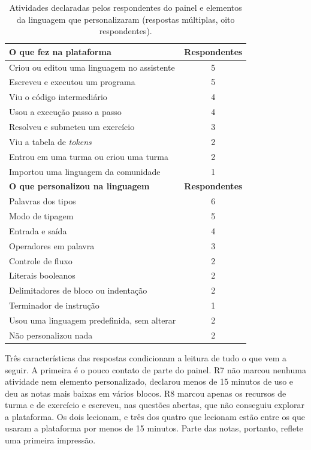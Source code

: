 \begin{table}[htbp]
\centering
\caption{Atividades declaradas pelos respondentes do painel e elementos da linguagem que personalizaram (respostas múltiplas, oito respondentes).}
\label{tab:resultado-atividades}
\footnotesize
\renewcommand{\arraystretch}{1.2}
\begin{tabular}{|p{10.5cm}|c|}
\hline
\textbf{O que fez na plataforma} & \textbf{Respondentes} \\\hline
Criou ou editou uma linguagem no assistente & 5 \\\hline
Escreveu e executou um programa & 5 \\\hline
Viu o código intermediário & 4 \\\hline
Usou a execução passo a passo & 4 \\\hline
Resolveu e submeteu um exercício & 3 \\\hline
Viu a tabela de \textit{tokens} & 2 \\\hline
Entrou em uma turma ou criou uma turma & 2 \\\hline
Importou uma linguagem da comunidade & 1 \\\hline
\textbf{O que personalizou na linguagem} & \textbf{Respondentes} \\\hline
Palavras dos tipos & 6 \\\hline
Modo de tipagem & 5 \\\hline
Entrada e saída & 4 \\\hline
Operadores em palavra & 3 \\\hline
Controle de fluxo & 2 \\\hline
Literais booleanos & 2 \\\hline
Delimitadores de bloco ou indentação & 2 \\\hline
Terminador de instrução & 1 \\\hline
Usou uma linguagem predefinida, sem alterar & 2 \\\hline
Não personalizou nada & 2 \\\hline
\end{tabular}
\end{table}

Três características das respostas condicionam a leitura de tudo o que vem a seguir. A primeira é o pouco contato de parte do painel. R7 não marcou nenhuma atividade nem elemento personalizado, declarou menos de 15 minutos de uso e deu as notas mais baixas em vários blocos. R8 marcou apenas os recursos de turma e de exercício e escreveu, nas questões abertas, que não conseguiu explorar a plataforma. Os dois lecionam, e três dos quatro que lecionam estão entre os que usaram a plataforma por menos de 15 minutos. Parte das notas, portanto, reflete uma primeira impressão.


